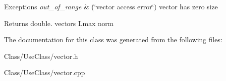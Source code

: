 \begin{DoxyExceptions}{Exceptions}
{\em out\+\_\+of\+\_\+range} & (\char`\"{}vector access error\char`\"{}) vector has zero size \\
\hline
\end{DoxyExceptions}
\begin{DoxyReturn}{Returns}
double. vectors Lmax norm 
\end{DoxyReturn}


The documentation for this class was generated from the following files\+:\begin{DoxyCompactItemize}
\item 
Class/\+Use\+Class/vector.\+h\item 
Class/\+Use\+Class/vector.\+cpp\end{DoxyCompactItemize}
